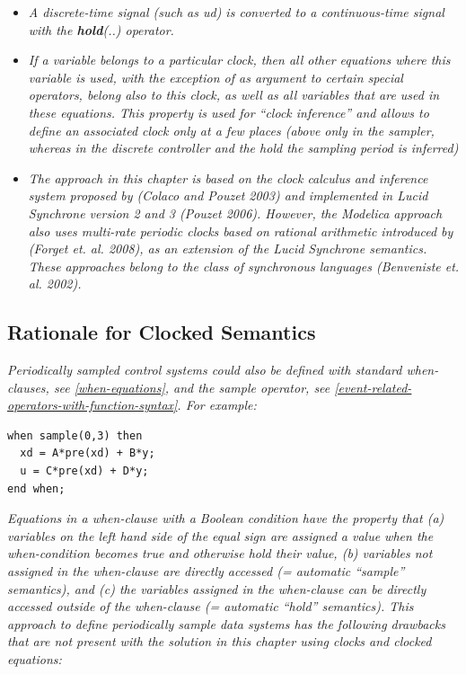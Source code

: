 \documentclass[10pt,a4paper]{report}
\def\doublelabel#1{\label{#1}\hypertarget{#1}{}}
\begin{document}
\begin{itemize}
{  of xd is returned.}
\item
  \emph{A discrete-time signal (such as ud) is converted to a
  continuous-time signal with the \textbf{hold}(..) operator.}
\item
  \emph{If a variable belongs to a particular clock, then all other
  equations where this variable is used, with the exception of as
  argument to certain special operators, belong also to this clock, as
  well as all variables that are used in these equations. This property
  is used for ``clock inference'' and allows to define an associated
  clock only at a few places (above only in the sampler, whereas in the
  discrete controller and the hold the sampling period is inferred)}
\item
  \emph{The approach in this chapter is based on the clock calculus and
  inference system proposed by (Colaco and Pouzet 2003) and implemented
  in Lucid Synchrone version 2 and 3 (Pouzet 2006). However, the
  Modelica approach also uses multi-rate periodic clocks based on
  rational arithmetic introduced by (Forget et. al. 2008), as an
  extension of the Lucid Synchrone semantics. These approaches belong to
  the class of synchronous languages (Benveniste et. al. 2002). }
\end{itemize}

\subsection{Rationale for Clocked Semantics}\doublelabel{rationale-for-clocked-semantics}

\emph{Periodically sampled control systems could also be defined with
standard when-clauses, see \ref{when-equations}, and the sample operator, see
\ref{event-related-operators-with-function-syntax}. For example:}
\begin{lstlisting}[language=modelica]
when sample(0,3) then
  xd = A*pre(xd) + B*y;
  u = C*pre(xd) + D*y;
end when;
\end{lstlisting}

\emph{Equations in a when-clause with a Boolean condition have the
property that (a) variables on the left hand side of the equal sign are
assigned a value when the when-condition becomes true and otherwise hold
their value, (b) variables not assigned in the when-clause are directly
accessed (= automatic ``sample'' semantics), and (c) the variables
assigned in the when-clause can be directly accessed outside of the
when-clause (= automatic ``hold'' semantics). This approach to define
periodically sample data systems has the following drawbacks that are
not present with the solution in this chapter using clocks and clocked
equations:}
\end{document}
